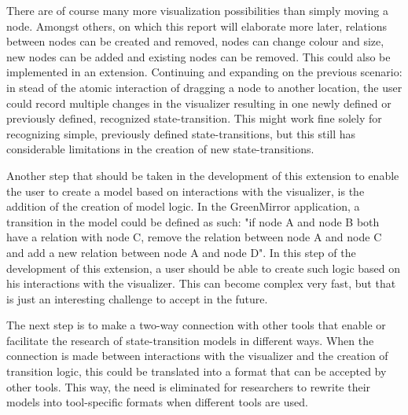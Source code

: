 \documentclass[a4paper]{article}
\begin{document}
There are of course many more visualization possibilities than simply moving a node. Amongst others, on which this report will elaborate more later, relations between nodes can be created and removed, nodes can change colour and size, new nodes can be added and existing nodes can be removed. This could also be implemented in an extension. Continuing and expanding on the previous scenario: in stead of the atomic interaction of dragging a node to another location, the user could record multiple changes in the visualizer resulting in one newly defined or previously defined, recognized state-transition. This might work fine solely for recognizing simple, previously defined state-transitions, but this still has considerable limitations in the creation of new state-transitions.

Another step that should be taken in the development of this extension to enable the user to create a model based on interactions with the visualizer, is the addition of the creation of model logic. In the GreenMirror application, a transition in the model could be defined as such: "if node A and node B both have a relation with node C, remove the relation between node A and node C and add a new relation between node A and node D". In this step of the development of this extension, a user should be able to create such logic based on his interactions with the visualizer. This can become complex very fast, but that is just an interesting challenge to accept in the future.

The next step is to make a two-way connection with other tools that enable or facilitate the research of state-transition models in different ways. When the connection is made between interactions with the visualizer and the creation of transition logic, this could be translated into a format that can be accepted by other tools. This way, the need is eliminated for researchers to rewrite their models into tool-specific formats when different tools are used.


\end{document}

